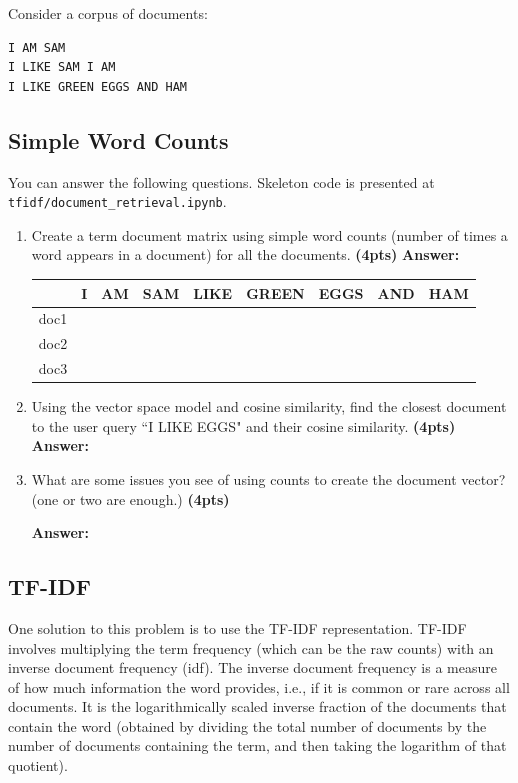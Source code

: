 \documentclass{assignment format}
\newenvironment{answer}{
    {\bf Answer:} \begingroup\color{red}
}{\endgroup}%
\begin{document}
Consider a corpus of documents:
\begin{verbatim}
I AM SAM
I LIKE SAM I AM
I LIKE GREEN EGGS AND HAM
\end{verbatim}

\subsection{Simple Word Counts}
You can answer the following questions. Skeleton code is presented at \texttt{tfidf/document\_retrieval.ipynb}. 
\begin{enumerate}[label=(\alph*)]
    \item Create a term document matrix using simple word counts (number of times a word appears in a document) for all the documents.  \textbf{(4pts)}
        \begin{answer}
\begin{table}[H]
\centering
\label{tab:my-table}
\begin{tabular}{|l|l|l|l|l|l|l|l|l|}
\hline
     & I & AM & SAM & LIKE & GREEN & EGGS & AND & HAM \\ \hline
doc1 &   &    &     &      &       &      &     &     \\ \hline
doc2 &   &    &     &      &       &      &     &     \\ \hline
doc3 &   &    &     &      &       &      &     &     \\ \hline
\end{tabular}
\end{table}
    \end{answer}
    \item Using the vector space model and cosine similarity, find the closest document to the user query ``I LIKE EGGS" and their cosine similarity. \textbf{(4pts)}
        \begin{answer}

    \end{answer}
    
    \item What are some issues you see of using counts to create the document vector? (one or two are enough.) \textbf{(4pts)}

        \begin{answer}

    \end{answer}
\end{enumerate}
\subsection{TF-IDF}
One solution to this problem is to use the TF-IDF representation.
    TF-IDF involves multiplying the term frequency (which can be the raw counts) with an inverse document frequency (idf). 
    The inverse document frequency is a measure of how much information the word provides, i.e., if it is common or rare across all documents. 
     It is the logarithmically scaled inverse fraction of the documents that contain the word (obtained by dividing the total number of documents by the number of documents containing the term, and then taking the logarithm of that quotient).
     
\end{document}
